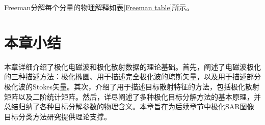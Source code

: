 Freeman分解每个分量的物理解释如表\ref{Freeman table}所示。
\begin{table}[!ht]
    \caption{Freeman分解}
    \label{Freeman table}
\end{table}

\section{本章小结}
本章详细介绍了极化电磁波和极化散射数据的理论基础。首先，阐述了电磁波极化的三种描述方法：极化椭圆、用于描述完全极化波的琼斯矢量，以及用于描述部分极化波的Stokes矢量。其次，介绍了用于描述目标散射特征的方法，包括极化散射矩阵以及二阶统计矩阵。然后，详尽阐述了多种极化目标分解方法的基本原理，并总结归纳了各种目标分解参数的物理含义。本章旨在为后续章节中极化SAR图像目标分类方法研究提供理论支撑。